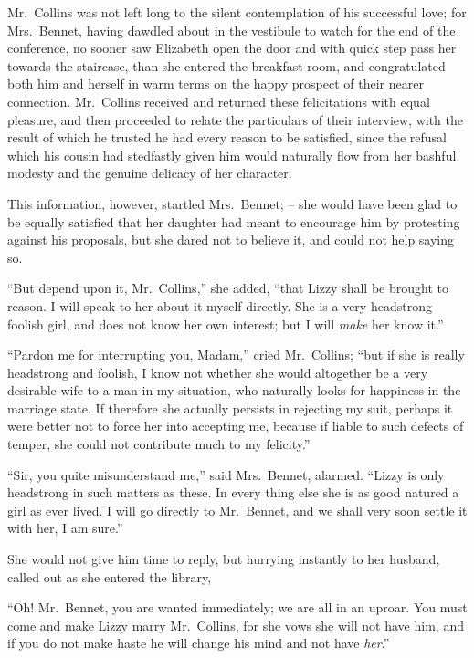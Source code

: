 Mr.\ Collins was not left long to the silent contemplation
of his successful love; for Mrs.\ Bennet, having dawdled
about in the vestibule to watch for the end of the conference,
no sooner saw Elizabeth open the door and with
quick step pass her towards the staircase, than she entered
the breakfast-room, and congratulated both him and herself
in warm terms on the happy prospect of their nearer
connection. Mr.\ Collins received and returned these
felicitations with equal pleasure, and then proceeded to
relate the particulars of their interview, with the result
of which he trusted he had every reason to be satisfied,
since the refusal which his cousin had stedfastly given
him would naturally flow from her bashful modesty and
the genuine delicacy of her character.

This information, however, startled Mrs.\ Bennet; -- she
would have been glad to be equally satisfied that her
daughter had meant to encourage him by protesting
against his proposals, but she dared not to believe it, and
could not help saying so.

“But depend upon it, Mr.\ Collins,” she added, “that
Lizzy shall be brought to reason. I will speak to her
about it myself directly. She is a very headstrong foolish
girl, and does not know her own interest; but I will
\textit{make} her know it.”

“Pardon me for interrupting you, Madam,” cried
Mr.\ Coll\-ins; “but if she is really headstrong and foolish,
I know not whether she would altogether be a very
desirable wife to a man in my situation, who naturally
looks for happiness in the marriage state. If therefore
she actually persists in rejecting my suit, perhaps it were
better not to force her into accepting me, because if liable
to such defects of temper, she could not contribute much
to my felicity.”

“Sir, you quite misunderstand me,” said Mrs.\ Bennet,
alarmed. “Lizzy is only headstrong in such matters as
these. In every thing else she is as good natured a girl
as ever lived. I will go directly to Mr.\ Bennet, and we
shall very soon settle it with her, I am sure.”

She would not give him time to reply, but hurrying
instantly to her husband, called out as she entered the
library,

“Oh! Mr.\ Bennet, you are wanted immediately; we
are all in an uproar. You must come and make Lizzy
marry Mr.\ Collins, for she vows she will not have him,
and if you do not make haste he will change his mind and
not have \textit{her}.”

